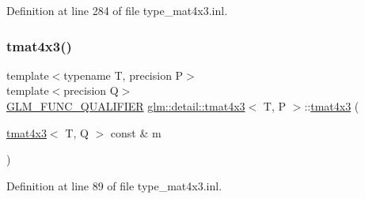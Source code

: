 Definition at line 284 of file type\+\_\+mat4x3.\+inl.

\mbox{\label{structglm_1_1detail_1_1tmat4x3_a75a5dd17c1376eaaf218a98be462222d}} 
\subsubsection{\texorpdfstring{tmat4x3()}{tmat4x3()}\hspace{0.1cm}{\footnotesize\ttfamily [19/22]}}
{\footnotesize\ttfamily template$<$typename T, precision P$>$ \\
template$<$precision Q$>$ \\
\hyperlink{setup_8hpp_a33fdea6f91c5f834105f7415e2a64407}{G\+L\+M\+\_\+\+F\+U\+N\+C\+\_\+\+Q\+U\+A\+L\+I\+F\+I\+ER} \hyperlink{structglm_1_1detail_1_1tmat4x3}{glm\+::detail\+::tmat4x3}$<$ T, P $>$\+::\hyperlink{structglm_1_1detail_1_1tmat4x3}{tmat4x3} (\begin{DoxyParamCaption}\item[{\hyperlink{structglm_1_1detail_1_1tmat4x3}{tmat4x3}$<$ T, Q $>$ const \&}]{m }\end{DoxyParamCaption})}



Definition at line 89 of file type\+\_\+mat4x3.\+inl.

\mbox{\label{structglm_1_1detail_1_1tmat4x3_a8b97a242c1d393f68f96995318bb0247}} 
